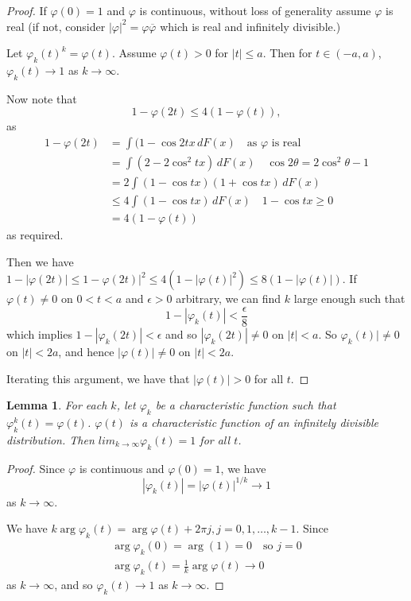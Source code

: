 \documentclass[10pt, oneside, reqno]{amsart}
\theoremstyle{plain}%
\newtheorem{lem}[thm]{Lemma}
\theoremstyle{definition}
\theoremstyle{remark}
\renewcommand{\phi}{\varphi}
\begin{document}
\begin{proof}
	If $\phi(0) = 1$ and $\phi$ is continuous, without loss of generality assume $\phi$ is real (if not, consider $|\phi|^2 = \phi \overline\phi$ which is real and infinitely divisible.)  
	
	Let $\phi_k(t)^k = \phi(t)$.  Assume $\phi(t) > 0$ for $|t| \leq a$.  Then for $t \in (-a, a)$, $\phi_k(t) \rightarrow 1$ as $k \rightarrow \infty$. 
	
	Now note that \[
		1 - \phi(2t) \leq 4(1 - \phi(t)), \tag{$\star$}
	\] as \begin{align*}
		1 - \phi(2t) 	&= \int (1 - \cos 2tx  \, dF(x) \quad \text{as $\phi$ is real }\\
						&= \int (2 -  2\cos^2 tx) \, dF(x) \quad \cos 2 \theta = 2 \cos^2 \theta - 1 \\
						&= 2  \int(1- \cos tx) (1 + \cos tx) \, dF(x) \\
						&\leq 4\int(1 - \cos tx) \, dF(x) \quad 1 - \cos tx \geq 0 \\
						&= 4(1 - \phi(t))
	\end{align*} as required.

	Then we have $1 - |\phi(2t)| \leq 1 - \phi(2t)|^2 \leq 4(1 - |\phi(t)|^2) \leq 8(1 - |\phi(t)|)$.  If $\phi(t) \neq 0$ on $0 < t < a$ and $\epsilon > 0$ arbitrary, we can find $k$ large enough such that \[
		1 - |\phi_k(t)| < \frac{\epsilon}{8}
	\]  which implies $1 - |\phi_k(2t)| < \epsilon$ and so $|\phi_k(2t)| \neq 0 $ on $|t| < a$.  So $\phi_k(t)| \neq 0$ on $|t| < 2a$, and hence $|\phi(t)| \neq 0$ on $|t| < 2a$.  
	
	Iterating this argument, we have that $|\phi(t)| > 0$ for all $t$.  
\end{proof}

\begin{lem}
	\label{lem:infd3}
	For each $k$, let $\phi_k$ be a characteristic function such that $\phi_k^k(t) = \phi(t)$.  $\phi(t)$ is a characteristic function of an infinitely divisible distribution.  Then $lim_{k \rightarrow \infty} \phi_k(t) = 1$ for all $t$.  
\end{lem}
\begin{proof}
	Since $\phi$ is continuous and $\phi(0) = 1$, we have \[
		| \phi_k(t) | = |\phi(t)|^{1/k} \rightarrow 1 
	\] as $k \rightarrow \infty$.  
	
	We have $k \arg \phi_k(t) = \arg \phi(t) + 2 \pi j, j = 0, 1, \dots, k-1$.  Since \begin{align*}
		\arg \phi_k(0) = \arg(1) = 0 \quad \text{so $j = 0$} \\
		\arg \phi_k(t) = \frac{1}{k} \arg \phi(t) \rightarrow 0 
	\end{align*} as $k \rightarrow \infty$, and so $\phi_k(t) \rightarrow 1$ as $k \rightarrow \infty$.  
\end{proof}
\end{document}
